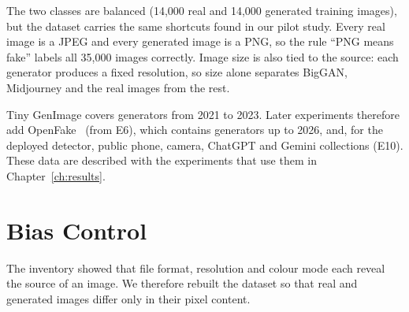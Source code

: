 \documentclass{mnnit}
\begin{document}
The two classes are balanced (14{,}000 real and 14{,}000 generated
training images), but the dataset carries the same shortcuts found in our
pilot study. Every real image is a JPEG and every generated image is a
PNG, so the rule ``PNG means fake'' labels all 35{,}000 images correctly.
Image size is also tied to the source: each generator produces a fixed
resolution, so size alone separates BigGAN, Midjourney and the real
images from the rest.

Tiny GenImage covers generators from 2021 to 2023. Later experiments
therefore add OpenFake~\cite{livernoche2025openfake} (from E6), which
contains generators up to 2026, and, for the deployed detector, public
phone, camera, ChatGPT and Gemini collections (E10). These data are
described with the experiments that use them in
Chapter~\ref{ch:results}.

\section{Bias Control}
\label{sec:bias}
The inventory showed that file format, resolution and colour mode each
reveal the source of an image. We therefore rebuilt the dataset so that
real and generated images differ only in their pixel content.
\end{document}
